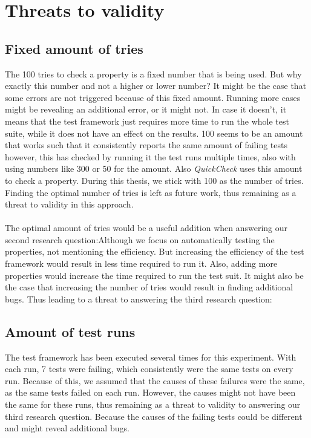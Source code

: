 \section{Threats to validity}

\subsection*{Fixed amount of tries}
The 100 tries to check a property is a fixed number that is being used. But why
exactly this number and not a higher or lower number? It might be the case that
some errors are not triggered because of this fixed amount. Running more cases
might be revealing an additional error, or it might not. In case it doesn't, it
means that the test framework just requires more time to run the whole test suite,
while it does not have an effect on the results. 100 seems to be an amount that
works such that it consistently reports the same amount of failing tests
however, this has checked by running it the test runs multiple times, also with
using numbers like 300 or 50 for the amount. Also \textit{QuickCheck} uses this
amount to check a property. During this thesis, we stick with 100 as the number
of tries. Finding the optimal number of tries is left as future work, thus
remaining as a threat to validity in this approach.\\
\\
The optimal amount of tries would be a useful addition when answering our second research question:\rqTwo Although we focus on automatically testing the properties, not mentioning the efficiency. But increasing the efficiency of the test framework would result in less time required to run it. Also, adding more properties would increase the time required to run the test suit. It might also be the case that increasing the number of tries would result in finding additional bugs. Thus leading to a threat to answering the third research question:\rqThree

\subsection*{Amount of test runs}
The test framework has been executed several times for this experiment. With
each run, 7 tests were failing, which consistently were the same tests on every
run. Because of this, we assumed that the causes of these failures were the
same, as the same tests failed on each run. However, the causes might not have
been the same for these runs, thus remaining as a threat to validity to
answering our third research question. Because the causes of the failing tests
could be different and might reveal additional bugs.

